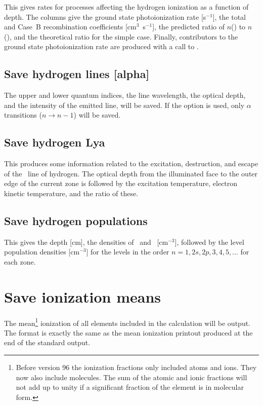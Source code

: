 This gives rates for processes affecting the hydrogen ionization as a
function of depth.  The columns give the ground state photoionization rate
[s$^{-1}$], the total and Case~B recombination coefficients [cm$^3$~s$^{-1}$], the
predicted ratio of $n$(\hplus) to $n$(\hO), and the theoretical ratio for the simple
case.  Finally, contributors to the ground state photoionization rate are
produced with a call to .

\subsection{Save hydrogen lines [alpha]}

The upper and lower quantum indices, the line wavelength, the optical
depth, and the intensity of the emitted line, will be saved. If the 
option is used, only $\alpha$ transitions ($n\to n-1$) will be saved.

\subsection{Save hydrogen Lya}

This produces some information related to the excitation, destruction,
and escape of the \la\ line of hydrogen.  The optical depth from the
illuminated face to the outer edge of the current zone is followed by the
excitation temperature, electron kinetic temperature, and the ratio of these.

\subsection{Save hydrogen populations}

This gives the depth [cm], the densities of \hO\ and \hplus\ [cm$^{-3}$],
followed by the level population densities [cm$^{-3}$]
for the levels in the order $n = 1, 2s, 2p, 3, 4, 5,\dots$ for each zone.

\section{Save ionization means}
\label{sec:CommandSaveIonizationMeans} 

The mean\footnote{Before version 96 the ionization fractions only included atoms and
ions.  They now also include molecules.  The sum of the atomic and ionic
fractions will not add up to unity if a significant fraction of the element
is in molecular form.} ionization of all elements included in the calculation will
be output.  The format is exactly the same as the mean ionization printout
produced at the end of the standard output.

